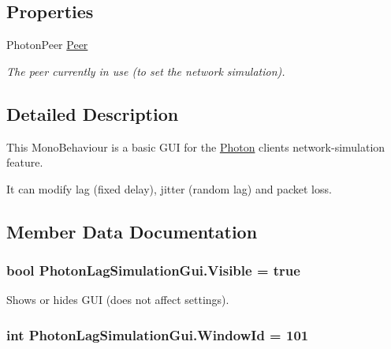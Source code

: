 \subsection*{Properties}
\begin{DoxyCompactItemize}
\item 
Photon\+Peer \hyperlink{class_photon_lag_simulation_gui_ad6ae62fc67cdb2936b13029ec7c68d64}{Peer}
\begin{DoxyCompactList}\small\item\em The peer currently in use (to set the network simulation).\end{DoxyCompactList}\end{DoxyCompactItemize}


\subsection{Detailed Description}
This Mono\+Behaviour is a basic G\+UI for the \hyperlink{namespace_photon}{Photon} client\textquotesingle{}s network-\/simulation feature. 

It can modify lag (fixed delay), jitter (random lag) and packet loss. 

\subsection{Member Data Documentation}
\subsubsection[{\texorpdfstring{Visible}{Visible}}]{\setlength{\rightskip}{0pt plus 5cm}bool Photon\+Lag\+Simulation\+Gui.\+Visible = true}\hypertarget{class_photon_lag_simulation_gui_ad790a872afa4c4c1b34401f55982203a}{}\label{class_photon_lag_simulation_gui_ad790a872afa4c4c1b34401f55982203a}


Shows or hides G\+UI (does not affect settings).

\subsubsection[{\texorpdfstring{Window\+Id}{WindowId}}]{\setlength{\rightskip}{0pt plus 5cm}int Photon\+Lag\+Simulation\+Gui.\+Window\+Id = 101}\hypertarget{class_photon_lag_simulation_gui_a0e20da80809bd2181828edabed39ccc9}{}\label{class_photon_lag_simulation_gui_a0e20da80809bd2181828edabed39ccc9}


